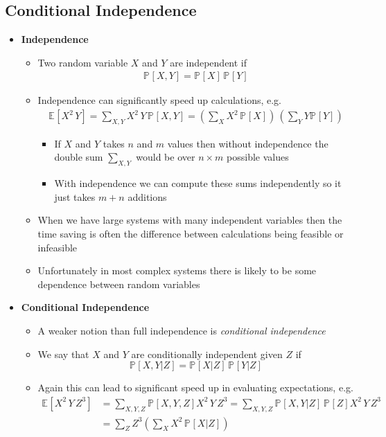 \documentclass[11pt]{article}
\newcommand{\av}[2][]{\mathbb{E}_{#1\!}\left[ #2 \right]}
\newcommand{\Prob}[2][]{\mathbb{P}_{#1\!}\left[ #2 \right]}
\begin{document}
\subsection{Conditional Independence}
\label{sec:orgeb8730f}
\begin{itemize}
\item \textbf{Independence}
\begin{itemize}
\item Two random variable \(X\) and \(Y\) are independent if
\begin{align*}
\Prob{X,Y} = \Prob{X}\,\Prob{Y}
\end{align*}
\item Independence can significantly speed up calculations, e.g.
\begin{align*}
\av{X^2\,Y} = \sum_{X,Y} X^2\,Y\,\Prob{X,Y} 
= \left( \sum_{X} X^{2} \, \Prob{X} \right)\, \left( \sum_{Y} Y \Prob{Y} \right)
\end{align*}
\begin{itemize}
\item If \(X\) and \(Y\) takes \(n\) and \(m\) values then without
independence the double sum \(\sum_{X,Y}\) would be over
\(n\times m\) possible values
\item With independence we can compute these sums independently so
it just takes \(m+n\)  additions
\end{itemize}
\item When we have large systems with many independent variables
then the time saving is often the difference between
calculations being feasible or infeasible
\item Unfortunately in most complex systems there is likely to be
some dependence between random variables
\end{itemize}
\item \textbf{Conditional Independence}
\begin{itemize}
\item A weaker notion than full independence is \emph{conditional independence}
\item We say that \(X\) and \(Y\) are conditionally independent given
\(Z\) if
$$ \Prob{X,Y|Z} = \Prob{X|Z}\,\Prob{Y|Z} $$
\item Again this can lead to significant speed up in evaluating
expectations, e.g.
\begin{align*}
\av{X^{2}\,Y\,Z^{3}} &= \sum_{X,Y,Z} \Prob{X,Y,Z} X^{2}\,Y\,Z^{3}
= \sum_{X,Y,Z} \Prob{X,Y|Z}\,\Prob{Z} X^{2}\,Y\,Z^{3} \\
&= \sum_{Z} Z^{3} \left( \sum_{X} X^{2}\,\Prob{X|Z}\right)

\end{align*}
\end{itemize}
\end{itemize}
\end{document}
